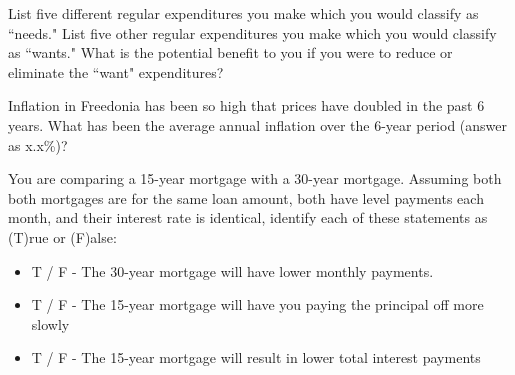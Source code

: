 \documentclass[12pt]{exam}
\begin{document}
\begin{questions}
    \question List five different regular expenditures you make which you would classify as ``needs." List five
    other regular expenditures you make which you would classify as ``wants." What is the potential benefit to
    you if you were to reduce or eliminate the ``want" expenditures?
    \vspace{1.5in}

    \question Inflation in Freedonia has been so high that prices have doubled in the past 6 years.
    What has been the average annual inflation over the 6-year period (answer as x.x\%)?
    \vspace{1.25in}

    \question You are comparing a 15-year mortgage with a 30-year mortgage.  Assuming both
    both mortgages are for the same loan amount, both have level payments each month, and their
    interest rate is identical, identify each of these statements as (T)rue or (F)alse:
    \begin{itemize}
        \item T / F - The 30-year mortgage will have lower monthly payments.
        \item T / F - The 15-year mortgage will have you paying the principal off more slowly
        \item T / F - The 15-year mortgage will result in lower total interest payments
    \end{itemize}

\end{questions}
\end{document}
